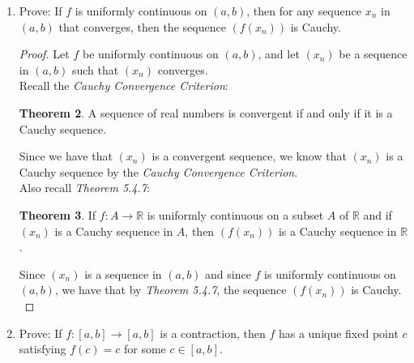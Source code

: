 \documentclass[12pt,letterpaper]{article}
\newcommand{\st}{\ \text{s.t.}\ }
\newcommand{\R}{\mathbb{R}}
\theoremstyle{case}
\theoremstyle{definition}
\newtheorem*{theorem*}{Theorem}
\begin{document}
\begin{enumerate}
\begin{enumerate}
\begin{proof}
				Recall \textit{Bolzano's Intermediate Value Theorem}:
				\begin{theorem*}[\textbf{Bolzano's Intermediate Value Theorem}]
					Let $I$ be an interval and let $f:I \rightarrow \R$ be continuous on $I$. If $a,b \in I$ and if $k \in \R$ satisfies $f(a) < k<f(b)$, then there exists a point $c \in I$ between $a$ and $b$ such that $f(c) = k$.
				\end{theorem*}
			
				Thus by \textit{Bolzano's Intermediate Value Theorem}, we have that $\exists\ c \in (a,b) \st h(c)=0$. Thus we have that $h(c)=0=f(c)-g(c) \implies g(c)=f(c)$. Thus $g(c)=f(c)$.\\
			\end{proof}
			\item Prove: If $f$ is uniformly continuous on $(a,b)$, then for any sequence $x_n$ in $(a,b)$ that converges, then the sequence $(f(x_n))$ is Cauchy.\\
			
			\begin{proof}
				Let $f$ be uniformly continuous on $(a,b)$, and let $(x_n)$ be a sequence in $(a,b)$ such that $(x_n)$ converges.\\
				
				Recall the \textit{Cauchy Convergence Criterion}:
				\begin{theorem*}
					A sequence of real numbers is convergent if and only if it is a Cauchy sequence.
				\end{theorem*}
				Since we have that $(x_n)$ is a convergent sequence, we know that $(x_n)$ is a Cauchy sequence by the \textit{Cauchy Convergence Criterion}.\\
				
				Also recall \textit{Theorem 5.4.7}:
				\begin{theorem*}
					If $f:A \rightarrow \R$ is uniformly continuous on a subset $A$ of $\R$ and if $(x_n)$ is a Cauchy sequence in $A$, then $(f(x_n))$ is a Cauchy sequence in $\R$.
				\end{theorem*}
				Since $(x_n)$ is a sequence in $(a,b)$ and since $f$ is uniformly continuous on $(a,b)$, we have that by \textit{Theorem 5.4.7}, the sequence $(f(x_n))$ is Cauchy.\\
			\end{proof}
			\item Prove: If $f:[a,b] \to [a,b]$ is a contraction, then $f$ has a unique fixed point $c$ satisfying $f(c)=c$ for some $c \in [a,b]$.\\
			

\end{enumerate}
\end{enumerate}
\end{document}
